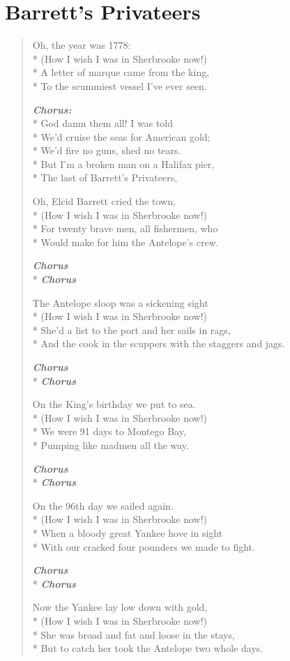 \documentclass[9pt,twoside]{extarticle}
\makeatletter
\newenvironment{xverse}{
	\begin{verse}
	\fontsize{8.5}{10.5}\selectfont
}{
	\end{verse}
}
\newcommand{\chorusdef}{\textbf{\emph{Chorus:}}\\*}
\newcommand{\chorus@mark}[1][1]{%
\textbf{\emph{Chorus \ifthenelse{\equal{#1}{1}}{}{$\times$ #1}}}%
}
\newcommand{\chorusmark}[1][1]{%
\ifvmode%
\vspace{-0.5\stanzaskip}%
\chorus@mark[#1]%
\vspace{-0.5\stanzaskip}%
\else \\*%
\chorus@mark[#1]%
\fi%
}
\makeatother
\begin{document}
\section{Barrett’s Privateers}

\begin{xverse}
Oh, the year was 1778: \\*
(How I wish I was in Sherbrooke now!) \\*
A letter of marque came from the king, \\*
To the scummiest vessel I’ve ever seen.

\chorusdef
God damn them all! I was told \\*
We’d cruise the seas for American gold; \\*
We’d fire no guns, shed no tears. \\*
But I’m a broken man on a Halifax pier, \\*
The last of Barrett’s Privateers,

Oh, Elcid Barrett cried the town, \\*
(How I wish I was in Sherbrooke now!) \\*
For twenty brave men, all fishermen, who \\*
Would make for him the Antelope’s crew.

\chorusmark

The Antelope sloop was a sickening sight \\*
(How I wish I was in Sherbrooke now!) \\*
She’d a list to the port and her sails in rags, \\*
And the cook in the scuppers with the staggers and jags.

\chorusmark

On the King’s birthday we put to sea. \\*
(How I wish I was in Sherbrooke now!) \\*
We were 91 days to Montego Bay, \\*
Pumping like madmen all the way.

\chorusmark

On the 96th day we sailed again. \\*
(How I wish I was in Sherbrooke now!) \\*
When a bloody great Yankee hove in sight \\*
With our cracked four pounders we made to fight.

\chorusmark

Now the Yankee lay low down with gold, \\*
(How I wish I was in Sherbrooke now!) \\*
She was broad and fat and loose in the stays, \\*
But to catch her took the Antelope two whole days.


\end{xverse}
\end{document}
